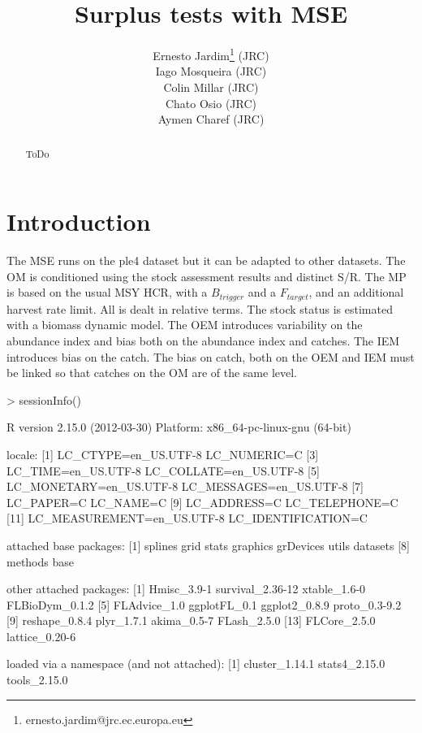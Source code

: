 \documentclass[a4paper]{article}
\begin{document}
\title{Surplus tests with MSE}
\author{Ernesto Jardim\footnote{ernesto.jardim@jrc.ec.europa.eu} (JRC)\\ Iago Mosqueira (JRC) \\ Colin Millar (JRC)\\ Chato Osio (JRC)\\ Aymen Charef (JRC)}
\maketitle
\begin{abstract}
ToDo
\end{abstract} 

\pagebreak
\section{Introduction}

The MSE runs on the ple4 dataset but it can be adapted to other datasets. The OM is conditioned using the stock assessment results and distinct S/R. The MP is based on the usual MSY HCR, with a $B_{trigger}$ and a $F_{target}$, and an additional harvest rate limit. All is dealt in relative terms. The stock status is estimated with a biomass dynamic model. The OEM introduces variability on the abundance index and bias both on the abundance index and catches. The IEM introduces bias on the catch. The bias on catch, both on the OEM and IEM must be linked so that catches on the OM are of the same level.


\begin{Schunk}
\begin{Sinput}
> sessionInfo()
\end{Sinput}
\begin{Soutput}
R version 2.15.0 (2012-03-30)
Platform: x86_64-pc-linux-gnu (64-bit)

locale:
 [1] LC_CTYPE=en_US.UTF-8       LC_NUMERIC=C              
 [3] LC_TIME=en_US.UTF-8        LC_COLLATE=en_US.UTF-8    
 [5] LC_MONETARY=en_US.UTF-8    LC_MESSAGES=en_US.UTF-8   
 [7] LC_PAPER=C                 LC_NAME=C                 
 [9] LC_ADDRESS=C               LC_TELEPHONE=C            
[11] LC_MEASUREMENT=en_US.UTF-8 LC_IDENTIFICATION=C       

attached base packages:
[1] splines   grid      stats     graphics  grDevices utils     datasets 
[8] methods   base     

other attached packages:
 [1] Hmisc_3.9-1      survival_2.36-12 xtable_1.6-0     FLBioDym_0.1.2  
 [5] FLAdvice_1.0     ggplotFL_0.1     ggplot2_0.8.9    proto_0.3-9.2   
 [9] reshape_0.8.4    plyr_1.7.1       akima_0.5-7      FLash_2.5.0     
[13] FLCore_2.5.0     lattice_0.20-6  

loaded via a namespace (and not attached):
[1] cluster_1.14.1 stats4_2.15.0  tools_2.15.0  
\end{Soutput}
\end{Schunk}
\end{document}
